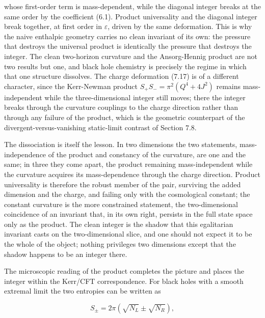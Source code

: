 \documentclass[11pt]{article}
\begin{document}
whose first-order term is mass-dependent, while the diagonal integer breaks at the same order by the coefficient (6.1). Product universality and the diagonal integer break together, at first order in $\varepsilon$, driven by the same deformation. This is why the naive enthalpic geometry carries no clean invariant of its own: the pressure that destroys the universal product is identically the pressure that destroys the integer. The clean two-horizon curvature and the Ansorg-Hennig product are not two results but one, and black hole chemistry is precisely the regime in which that one structure dissolves. The charge deformation (7.17) is of a different character, since the Kerr-Newman product $S_+S_- = \pi^2(Q^4 + 4J^2)$ remains mass-independent while the three-dimensional integer still moves; there the integer breaks through the curvature couplings to the charge direction rather than through any failure of the product, which is the geometric counterpart of the divergent-versus-vanishing static-limit contrast of Section 7.8.

The dissociation is itself the lesson. In two dimensions the two statements, mass-independence of the product and constancy of the curvature, are one and the same; in three they come apart, the product remaining mass-independent while the curvature acquires its mass-dependence through the charge direction. Product universality is therefore the robust member of the pair, surviving the added dimension and the charge, and failing only with the cosmological constant; the constant curvature is the more constrained statement, the two-dimensional coincidence of an invariant that, in its own right, persists in the full state space only as the product. The clean integer is the shadow that this egalitarian invariant casts on the two-dimensional slice, and one should not expect it to be the whole of the object; nothing privileges two dimensions except that the shadow happens to be an integer there.

The microscopic reading of the product completes the picture and places the integer within the Kerr/CFT correspondence. For black holes with a smooth extremal limit the two entropies can be written as

\begin{equation*}
S_\pm = 2\pi\left(\sqrt{N_L} \pm \sqrt{N_R}\right),
\tag{7.26}
\end{equation*}
\end{document}
